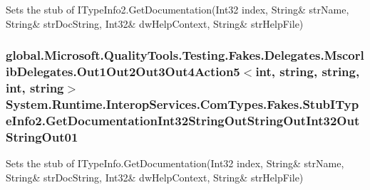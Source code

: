 Sets the stub of I\-Type\-Info2.\-Get\-Documentation(Int32 index, String\& str\-Name, String\& str\-Doc\-String, Int32\& dw\-Help\-Context, String\& str\-Help\-File)

\hypertarget{class_system_1_1_runtime_1_1_interop_services_1_1_com_types_1_1_fakes_1_1_stub_i_type_info2_a6ad96434cf53a1d9349f3b77e3ff1c33}{
\subsubsection[{Get\-Documentation\-Int32\-String\-Out\-String\-Out\-Int32\-Out\-String\-Out01}]{\setlength{\rightskip}{0pt plus 5cm}global.\-Microsoft.\-Quality\-Tools.\-Testing.\-Fakes.\-Delegates.\-Mscorlib\-Delegates.\-Out1\-Out2\-Out3\-Out4\-Action5$<$int, string, string, int, string$>$ System.\-Runtime.\-Interop\-Services.\-Com\-Types.\-Fakes.\-Stub\-I\-Type\-Info2.\-Get\-Documentation\-Int32\-String\-Out\-String\-Out\-Int32\-Out\-String\-Out01}}\label{class_system_1_1_runtime_1_1_interop_services_1_1_com_types_1_1_fakes_1_1_stub_i_type_info2_a6ad96434cf53a1d9349f3b77e3ff1c33}


Sets the stub of I\-Type\-Info.\-Get\-Documentation(Int32 index, String\& str\-Name, String\& str\-Doc\-String, Int32\& dw\-Help\-Context, String\& str\-Help\-File)

